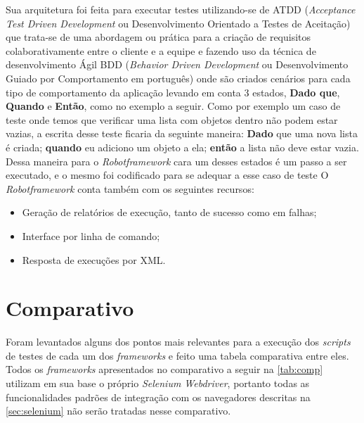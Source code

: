         Sua arquitetura foi feita para executar testes utilizando-se de ATDD (\textit{Acceptance Test Driven Development} ou Desenvolvimento Orientado
        a Testes de Aceitação) que trata-se de uma abordagem ou prática para a criação de requisitos colaborativamente entre o cliente e a equipe e
        fazendo uso da técnica de desenvolvimento Ágil BDD (\textit{Behavior Driven Development} ou Desenvolvimento Guiado por Comportamento em
        português) onde são criados cenários para cada tipo de comportamento da aplicação levando em conta 3 estados, \textbf{Dado que}, \textbf{Quando}
        e \textbf{Então}, como no exemplo a seguir. Como por exemplo um caso de teste onde temos que verificar uma lista com objetos dentro não podem
        estar vazias, a escrita desse teste ficaria da seguinte maneira: \textbf{Dado} que uma nova lista é criada; \textbf{quando} eu adiciono um objeto
        a ela; \textbf{então} a lista não deve estar vazia. Dessa maneira para o \textit{Robotframework} cara um desses estados é um passo a ser executado,
        e o mesmo foi codificado para se adequar a esse caso de teste O \textit{Robotframework} conta também com os seguintes recursos:

        \begin{itemize}
            \item Geração de relatórios de execução, tanto de sucesso como em falhas;
            \item Interface por linha de comando;
            \item Resposta de execuções por XML.
        \end{itemize}


    \section{Comparativo}

        Foram levantados alguns dos pontos mais relevantes para a execução dos \textit{scripts} de testes de cada um dos \textit{frameworks} e feito uma
        tabela comparativa entre eles. Todos os \textit{frameworks} apresentados no comparativo a seguir na \autoref{tab:comp} utilizam em sua base o
        próprio \textit{Selenium Webdriver}, portanto todas as funcionalidades padrões de integração com os navegadores descritas na \autoref{sec:selenium}
        não serão tratadas nesse comparativo.

        
        \vspace*{1,7cm}

